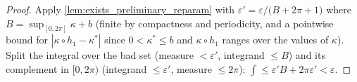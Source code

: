 \begin{proof}

\leanok
  Apply \cref{lem:exists_preliminary_reparam} with
  $\varepsilon'=\varepsilon/\bigl(B+2\pi+1\bigr)$ where
  $B=\sup_{[0,2\pi]}\kappa+b$ (finite by compactness and periodicity, and a pointwise
  bound for $|\kappa\circ h_1-\kappa^\ast|$ since $0<\kappa^\ast\le b$ and $\kappa\circ
  h_1$ ranges over the values of $\kappa$). Split the integral over the bad set (measure
  $<\varepsilon'$, integrand $\le B$) and its complement in $[0,2\pi)$ (integrand
  $\le\varepsilon'$, measure $\le2\pi$):
  $\int\le\varepsilon' B+2\pi\varepsilon'<\varepsilon$.
\end{proof}

